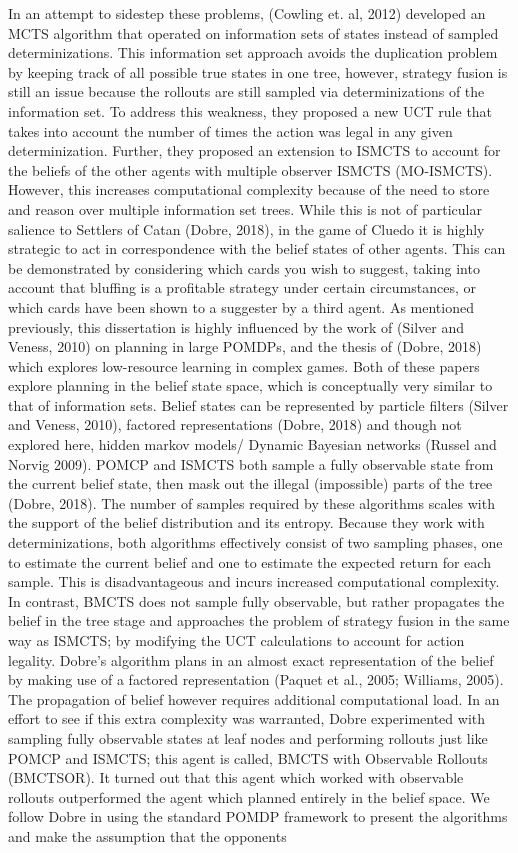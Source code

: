 \documentclass[a4paper,12pt]{proposal}
\begin{document}
In an attempt to sidestep these problems, (Cowling et. al, 2012) developed an MCTS algorithm that operated on information sets of states instead of sampled determinizations. This information set approach avoids the duplication problem by keeping track of all possible true states in one tree, however, strategy fusion is still an issue because the rollouts are still sampled via determinizations of the information set. To address this weakness, they proposed a new UCT rule that takes into account the number of times the action was legal in any given determinization. Further, they proposed an extension to ISMCTS to account for the beliefs of the other agents with multiple observer ISMCTS (MO-ISMCTS). However, this increases computational complexity because of the need to store and reason over multiple information set trees. While this is not of particular salience to Settlers of Catan (Dobre, 2018), in the game of Cluedo it is highly strategic to act in correspondence with the belief states of other agents. This can be demonstrated by considering which cards you wish to suggest, taking into account that bluffing is a profitable strategy under certain circumstances, or which cards have been shown to a suggester by a third agent. As mentioned previously, this dissertation is highly influenced by the work of (Silver and Veness, 2010) on planning in large POMDPs, and the thesis of (Dobre, 2018) which explores low-resource learning in complex games. Both of these papers explore planning in the belief state space, which is conceptually very similar to that of information sets. Belief states can be represented by particle filters (Silver and Veness, 2010), factored representations (Dobre, 2018) and though not explored here, hidden markov models/ Dynamic Bayesian networks (Russel and Norvig 2009). POMCP and ISMCTS both sample a fully observable state from the current belief state, then mask out the illegal (impossible) parts of the tree (Dobre, 2018). The number of samples required by these algorithms scales with the support of the belief distribution and its entropy. Because they work with determinizations, both algorithms effectively consist of two sampling phases, one to estimate the current belief and one to estimate the expected return for each sample. This is disadvantageous and incurs increased computational complexity. In contrast, BMCTS does not sample fully observable, but rather propagates the belief in the tree stage and approaches the problem of strategy fusion in the same way as ISMCTS; by modifying the UCT calculations to account for action legality. Dobre’s algorithm plans in an almost exact representation of the belief by making use of a factored representation (Paquet et al., 2005; Williams, 2005). The propagation of belief however requires additional computational load. In an effort to see if this extra complexity was warranted, Dobre experimented with sampling fully observable states at leaf nodes and performing rollouts just like POMCP and ISMCTS; this agent is called, BMCTS with Observable Rollouts (BMCTSOR). It turned out that this agent which worked with observable rollouts outperformed the agent which planned entirely in the belief space. We follow Dobre in using the standard POMDP framework to present the algorithms and make the assumption that the opponents 
\end{document}
